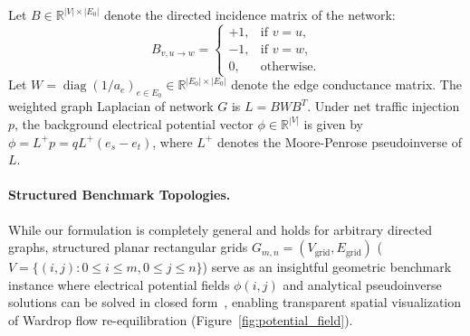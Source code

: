 \documentclass[11pt,a4paper]{article}
\begin{document}
Let $B \in \mathbb{R}^{|V| \times |E_0|}$ denote the directed incidence matrix of the network:
\begin{equation}
B_{v, u \to w} = 
\begin{cases}
+1, & \text{if } v = u, \\
-1, & \text{if } v = w, \\
0, & \text{otherwise.}
\end{cases}
\end{equation}
Let $W = \operatorname{diag}(1/a_e)_{e \in E_0} \in \mathbb{R}^{|E_0| \times |E_0|}$ denote the edge conductance matrix. The weighted graph Laplacian of network $G$ is $L = B W B^T$. Under net traffic injection $p$, the background electrical potential vector $\phi \in \mathbb{R}^{|V|}$ is given by $\phi = L^+ p = q L^+ (e_s - e_t)$, where $L^+$ denotes the Moore-Penrose pseudoinverse of $L$.

\paragraph{Structured Benchmark Topologies.}
While our formulation is completely general and holds for arbitrary directed graphs, structured planar rectangular grids $G_{m,n} = (V_{\text{grid}}, E_{\text{grid}})$ ($V = \{(i, j) : 0 \le i \le m, 0 \le j \le n\}$) serve as an insightful geometric benchmark instance where electrical potential fields $\phi(i, j)$ and analytical pseudoinverse solutions can be solved in closed form~\cite{lu2026braess}, enabling transparent spatial visualization of Wardrop flow re-equilibration (Figure~\ref{fig:potential_field}).
\end{document}
